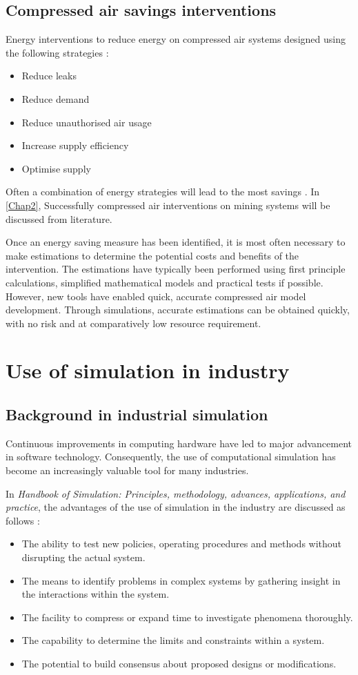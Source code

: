 	\subsection{Compressed air savings interventions}
		Energy interventions to reduce energy on compressed air systems designed using the following strategies \cite{Snyman2011Masters}:
		\begin{itemize}
			\item Reduce leaks
			\item Reduce demand
			\item Reduce unauthorised air usage
			\item Increase supply efficiency
			\item Optimise supply
		\end{itemize}
	 Often a combination of energy strategies will lead to the most savings \cite{Marais2012PhD}. In \cref{Chap2}, Successfully compressed air interventions on mining systems will be discussed from literature.
	 \par 
	 Once an energy saving measure has been identified, it is most often necessary to make estimations to determine the potential costs and benefits of the intervention. The estimations have typically been performed using first principle calculations, simplified mathematical models and practical tests if possible. However, new tools have enabled quick, accurate compressed air model development. Through simulations, accurate estimations can be obtained quickly, with no risk and at comparatively low resource requirement.
\section{Use of simulation in industry }
	\subsection{Background in industrial simulation}
	
		Continuous improvements in computing hardware have led to major advancement in software technology. Consequently, the use of computational simulation has become an increasingly valuable tool for many industries.\cite{kocsis2003integration} \par 
		In \textit{ Handbook of Simulation: Principles, methodology, advances, applications, and practice}, the advantages of the use of simulation in the industry are discussed as follows \cite{banks1998handbook}: %
		\begin{itemize}
			\item The ability to test new policies, operating procedures and methods without disrupting the actual system.
			\item The means to identify problems in complex systems by gathering insight in the interactions within the system.
			\item The facility to compress or expand time to investigate phenomena thoroughly.
			\item The capability to determine the limits and constraints within a system.
			\item The potential to build consensus about proposed designs or modifications.
		\end{itemize}

